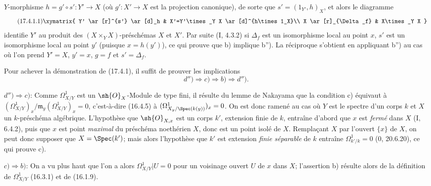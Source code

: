 $Y$-morphisme $h=g'\circ s':Y'\to X$ (où $g':X'\to X$ est la projection canonique), de sorte que $s'=(1_{Y'},h)_X$, et alors le diagramme
\[
\tag{17.4.1.1}
\label{IV.17.4.1.1}
\xymatrix{
Y' \ar[r]^{s'} \ar[d]_h & X'=Y'\times_Y X \ar[d]^{h\times 1_X}\\
X \ar[r]_{\Delta_f} & X\times_Y X
}
\]
identifie $Y'$ au produit des $(X\times_Y X)$-préschémas $X$ et $X'$. Par suite (I, 4.3.2) si $\Delta_f$ est un isomorphisme local au point $x$, $s'$ est un isomorphisme local au point $y'$ (puisque $x=h(y')$), ce qui prouve que b) implique b''). La réciproque s'obtient en appliquant b'') au cas où l'on prend $Y'=X$, $y'=x$, $g=f$ et $s'=\Delta_f$.

Pour achever la démonstration de (17.4.1), il suffit de prouver les implications
\[
d'')\Rightarrow c)\Rightarrow b)\Rightarrow d'').
\]

$d'')\Rightarrow c)$: Comme $\Omega^1_{X/Y}$ est un $\sh{O}_X$-Module de type fini, il résulte du lemme de Nakayama que la condition c) équivaut à $(\Omega^1_{X/Y})_x/\mathfrak{m}_y(\Omega^1_{X/Y})_x=0$, c'est-à-dire (16.4.5) à $(\Omega^1_{X_y/\Spec(k(y))})_x=0$. On est donc ramené au cas où $Y$ est le spectre d'un corps $k$ et $X$ un $k$-préschéma algébrique. L'hypothèse que $\sh{O}_{X,x}$ est un corps $k'$, extension finie de $k$, entraîne d'abord que $x$ est \emph{fermé} dans $X$ (I, 6.4.2), puis que $x$ est point \emph{maximal} du préschéma noethérien $X$, donc est un point isolé de $X$. Remplaçant $X$ par l'ouvert $\{x\}$ de $X$, on peut donc supposer que $X=\Spec(k')$; mais alors l'hypothèse que $k'$ est extension \emph{finie séparable} de $k$ entraîne $\Omega^1_{k'/k}=0$ (0, 20.6.20), ce qui prouve c).

$c)\Rightarrow b)$: On a vu plus haut que l'on a alors $\Omega^1_{X/Y}|U=0$ pour un voisinage ouvert $U$ de $x$ dans $X$; l'assertion b) résulte alors de la définition de $\Omega^1_{X/Y}$ (16.3.1) et de (16.1.9).

